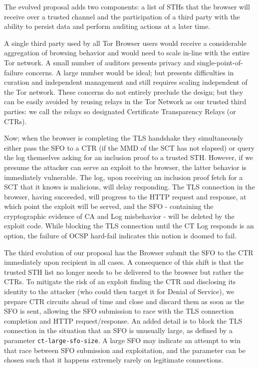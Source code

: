 The evolved proposal adds two components: a list of STHs that the browser will receive over a trusted channel and the participation of a third party with the ability to persist data and perform auditing actions at a later time.

A single third party used by all Tor Browser users would receive a considerable aggregation of browsing behavior and would need to scale in-line with the entire Tor network. A small number of auditors presents privacy and single-point-of-failure concerns. A large number would be ideal; but presents difficulties in curation and independent management and still requires scaling independent of the Tor network. These concerns do not entirely preclude the design; but they can be easily avoided by reusing relays in the Tor Network as our trusted third parties: we call the relays so designated Certificate Transparency Relays (or CTRs).

Now; when the browser is completing the TLS handshake they simultaneously either pass the SFO to a CTR (if the MMD of the SCT has not elapsed) or query the log themselves asking for an inclusion proof to a trusted STH.  However, if we presume the attacker can serve an exploit to the browser, the latter behavior is immediately vulnerable. The log, upon receiving an inclusion proof fetch for a SCT that it knows is malicious, will delay responding. The TLS connection in the browser, having succeeded, will progress to the HTTP request and response, at which point the exploit will be served, and the SFO - containing the cryptographic evidence of CA and Log misbehavior - will be deleted by the exploit code. While blocking the TLS connection until the CT Log responds is an option, the failure of OCSP hard-fail indicates this notion is doomed to fail. %

The third evolution of our proposal has the Browser submit the SFO to the CTR immediately upon recipient in all cases. A consequence of this shift is that the trusted STH list no longer needs to be delivered to the browser but rather the CTRs. To mitigate the risk of an exploit finding the CTR and disclosing its identity to the attacker (who could then target it for Denial of Service), we prepare CTR circuits ahead of time and close and discard them as soon as the SFO is sent, allowing the SFO submission to race with the TLS connection completion and HTTP request/response.  An added detail is to block the TLS connection in the situation that an SFO is unusually large, as defined by a parameter \texttt{ct-large-sfo-size}. A large SFO may indicate an attempt to win that race between SFO submission and exploitation, and the parameter can be chosen such that it happens extremely rarely on legitimate connections.

